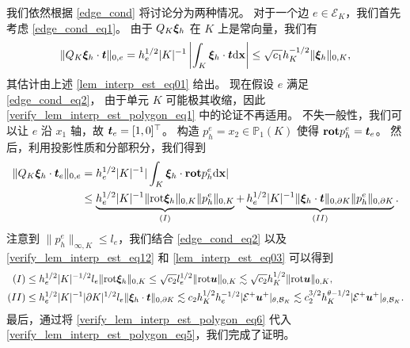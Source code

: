 我们依然根据 \eqref{edge_cond} 将讨论分为两种情况。
对于一个边 $e \in \mathcal{E}_K$，我们首先考虑 \eqref{edge_cond_eq1}。
由于 $Q_K\boldsymbol{\xi}_h$ 在 $K$ 上是常向量，我们有
\begin{equation}
\label{verify_lem_interp_est_polygon_eq1}
\| Q_K \boldsymbol{\xi}_h \cdot\boldsymbol{t} \|_{0,e} =  h_e^{1/2}|K|^{-1} \left|\int_K \boldsymbol{\xi}_h
\cdot\boldsymbol{t} \mathrm{ d} \mathbf{x}\right| \le \sqrt{c_1} h^{-1/2}_K \| \boldsymbol{\xi}_h \|_{0,K},
\end{equation}
其估计由上述 \eqref{lem_interp_est_eq01} 给出。
现在假设 $e$ 满足 \eqref{edge_cond_eq2}，
由于单元 $K$ 可能极其收缩，因此 \eqref{verify_lem_interp_est_polygon_eq1} 中的论证不再适用。
不失一般性，我们可以让 $e$ 沿 $x_1$ 轴，故 $\boldsymbol{t}_e = [1,0]^\top$。
构造 $p^e_h = x_2 \in \mathbb{P}_1(K)$ 使得 $\mathbf{rot} p^e_h = \boldsymbol{t}_e$。
然后，利用投影性质和分部积分，我们得到
\begin{equation}
\begin{split}
\label{verify_lem_interp_est_polygon_eq5}
\| Q_K\boldsymbol{\xi}_h\cdot\boldsymbol{t}_e \|_{0,e}& = h^{1/2}_e |K|^{-1} |\int_K \boldsymbol{\xi}_h\cdot
\mathbf{rot} p^e_h \mathrm{ d} \mathbf{x}  | \\
& \le \underbrace{ h^{1/2}_e |K|^{-1} \| \mathrm{rot} \boldsymbol{\xi}_h \|_{0,K} \| p^e_h \|_{0,K} }_{(I)} +  \underbrace{ h^{1/2}_e |K|^{-1} \| \boldsymbol{\xi}_h \cdot \boldsymbol{t} \|_{0,\partial K}  \|  p^e_h \|_{0,\partial K} }_{(II)}.
\end{split}
\end{equation}
注意到 $ \| p^e_h \|_{\infty,K} \le l_e$，我们结合 \eqref{edge_cond_eq2} 以及
\eqref{verify_lem_interp_est_eq12} 和 \eqref{lem_interp_est_eq03} 可以得到
\begin{subequations}
\label{verify_lem_interp_est_polygon_eq6}
\begin{align}
(I) & \le h^{1/2}_e |K|^{-1/2} l_e  \| \mathrm{rot} \boldsymbol{\xi}_h \|_{0,K} \le \sqrt{c_2} l^{1/2}_e \| \mathrm{rot} \boldsymbol{u} \|_{0,K} \lesssim \sqrt{c_2}  h^{1/2}_K \| \mathrm{rot} \boldsymbol{u} \|_{0,K}, \\
(II) & \le h^{1/2}_e |K|^{-1} |\partial K|^{1/2} l_e \| \boldsymbol{\xi}_h \cdot \boldsymbol{t} \|_{0,\partial K}  \lesssim c_2 h_K^{1/2} h^{-1/2}_e |  \mathcal{E}^+  \boldsymbol{u}^+ |_{\theta,\mathcal{B}_K}
\lesssim c^{3/2}_2  h^{\theta-1/2}_K |  \mathcal{E}^+  \boldsymbol{u}^+ |_{\theta,\mathcal{B}_K}.
\end{align}
\end{subequations}
最后，通过将 \eqref{verify_lem_interp_est_polygon_eq6} 代入 \eqref{verify_lem_interp_est_polygon_eq5}，我们完成了证明。

%
%
%

